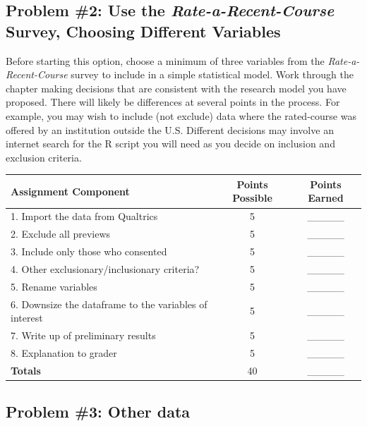 \documentclass[
  english,
]{book}
\begin{document}
\hypertarget{problem-2-use-the-rate-a-recent-course-survey-choosing-different-variables}{%
\subsection{\texorpdfstring{Problem \#2: Use the \emph{Rate-a-Recent-Course} Survey, Choosing Different Variables}{Problem \#2: Use the Rate-a-Recent-Course Survey, Choosing Different Variables}}\label{problem-2-use-the-rate-a-recent-course-survey-choosing-different-variables}}

Before starting this option, choose a minimum of three variables from the \emph{Rate-a-Recent-Course} survey to include in a simple statistical model. Work through the chapter making decisions that are consistent with the research model you have proposed. There will likely be differences at several points in the process. For example, you may wish to include (not exclude) data where the rated-course was offered by an institution outside the U.S. Different decisions may involve an internet search for the R script you will need as you decide on inclusion and exclusion criteria.

\begin{longtable}[]{@{}lcc@{}}
\toprule
Assignment Component & Points Possible & Points Earned \\
\midrule
\endhead
1. Import the data from Qualtrics & 5 & \_\_\_\_\_ \\
2. Exclude all previews & 5 & \_\_\_\_\_ \\
3. Include only those who consented & 5 & \_\_\_\_\_ \\
4. Other exclusionary/inclusionary criteria? & 5 & \_\_\_\_\_ \\
5. Rename variables & 5 & \_\_\_\_\_ \\
6. Downsize the dataframe to the variables of interest & 5 & \_\_\_\_\_ \\
7. Write up of preliminary results & 5 & \_\_\_\_\_ \\
8. Explanation to grader & 5 & \_\_\_\_\_ \\
\textbf{Totals} & 40 & \_\_\_\_\_ \\
\bottomrule
\end{longtable}

\hypertarget{problem-3-other-data}{%
\subsection{Problem \#3: Other data}\label{problem-3-other-data}}
\end{document}

